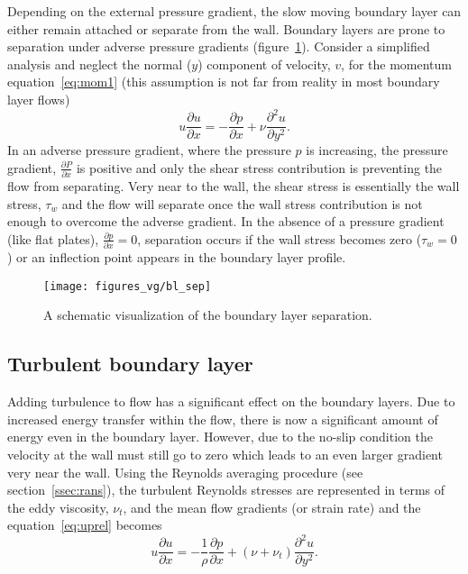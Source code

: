 Depending on the external pressure gradient, the slow moving boundary layer can either remain attached or separate from the wall. 
Boundary layers are prone to separation under adverse pressure gradients (figure~\ref{fig:blsep}). Consider a simplified analysis and neglect the normal ($y$) component of velocity, $v$, for the momentum equation~\ref{eq:mom1} (this assumption is not far from reality in most boundary layer flows)
\begin{equation}
u\frac{\partial u}{\partial x} = -\frac{\partial p}{\partial x} + \nu\frac{\partial^2 u}{\partial y^2}.
\label{eq:uprel}
\end{equation}
In an adverse pressure gradient, where the pressure $p$ is increasing, the pressure gradient, $\frac{\partial P}{\partial x}$ is positive and only the shear stress contribution is preventing the flow from separating. Very near to the wall, the shear stress is essentially the wall stress, $\tau_w$ and the flow will separate once the wall stress contribution is not enough to overcome the adverse gradient. In the absence of a pressure gradient (like flat plates), $\frac{\partial p}{\partial x} = 0$, separation occurs if the wall stress becomes zero ($\tau_w = 0$) or an inflection point appears in the boundary layer profile.
\begin{figure}[h]
\centering
 \texttt{[image: figures\_vg/bl\_sep]}
 \caption{A schematic visualization of the boundary layer separation.}
 \label{fig:blsep}
\end{figure}

\subsection{Turbulent boundary layer}\label{ssec:turbbl}

Adding turbulence to flow has a significant effect on the boundary layers. Due to increased energy transfer within the flow, there is now a significant amount of energy even in the boundary layer. However, due to the no-slip condition the velocity at the wall must still go to zero which leads to an even larger gradient very near the wall. Using the Reynolds averaging procedure (see section~\ref{ssec:rans}), the turbulent Reynolds stresses are represented in terms of the eddy viscosity, $\nu_t$, and the mean flow gradients (or strain rate) and the equation~\ref{eq:uprel} becomes
\begin{equation}
u\frac{\partial u}{\partial x} = -\frac{1}{\rho}\frac{\partial p}{\partial x} + (\nu + \nu_t)\frac{\partial^2 u}{\partial y^2}.
\label{eq:uprelt}
\end{equation}

